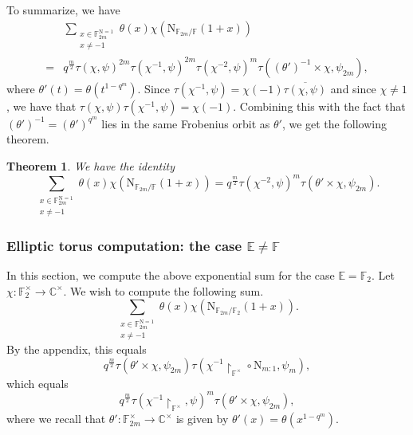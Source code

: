 \documentclass[12pt, reqno]{amsart}
\newtheorem{theorem}{Theorem}[section]
\theoremstyle{definition}
\theoremstyle{definition}
\theoremstyle{definition}
\newcommand{\cComplex}{\mathbb{C}}
\newcommand{\multiplicativegroup}[1]{#1^{\times}}
\newcommand{\conjugate}[1]{\overline{#1}}
\newcommand{\fieldCharacter}{\psi}
\newcommand{\FieldNorm}[2]{\mathrm{N}_{#1:#2}}
\newcommand{\aFieldNorm}{\mathrm{N}}
\newcommand{\finiteField}{\mathbb{F}}
\newcommand{\quadraticExtension}{\mathbb{E}}
\newcommand{\finiteFieldExtension}[1]{\finiteField_{#1}}
\newcommand{\NormOneGroup}[1]{\finiteFieldExtension{#1}^{\aFieldNorm = 1}}
\newcommand{\GaussSumSingleCharacter}[2]{\tau\left(#1, #2\right)}
\newcommand{\GaussSumCharacter}[3]{\tau\left(#1 \times #2, #3\right)}
\begin{document}
To summarize, we have
\begin{align*}
	& \sum_{\substack{x \in \NormOneGroup{2m}\\
			x \ne -1}} \theta \left(x\right) \chi\left(\aFieldNorm_{\finiteFieldExtension{2m} \slash \finiteField}\left(1 + x\right)\right) \\
		=& q^{\frac{m}{2}} \GaussSumSingleCharacter{\chi}{\fieldCharacter}^{2m} \GaussSumSingleCharacter{\chi^{-1}}{\fieldCharacter}^{2m} \GaussSumSingleCharacter{\chi^{-2}}{\fieldCharacter}^m \GaussSumCharacter{\left(\theta'\right)^{-1}}{\chi}{\fieldCharacter_{2m}},
\end{align*}
where $\theta'\left(t\right) = \theta\left(t^{1-q^m}\right)$.
Since $\tau\left(\chi^{-1}, \fieldCharacter\right) = \chi\left(-1\right) \conjugate{\tau\left(\chi, \fieldCharacter\right)}$ and since $\chi \ne 1$, we have that $\tau\left(\chi, \fieldCharacter\right) \tau\left(\chi^{-1}, \fieldCharacter\right) = \chi\left(-1\right)$. Combining this with the fact that $\left(\theta'\right)^{-1} = \left(\theta'\right)^{q^m}$ lies in the same Frobenius orbit as $\theta'$, we get the following theorem.
\begin{theorem}
	We have the identity $$\sum_{\substack{x \in \NormOneGroup{2m}\\
			x \ne -1}} \theta \left(x\right) \chi\left(\aFieldNorm_{\finiteFieldExtension{2m} \slash \finiteField}\left(1 + x\right)\right) = q^{\frac{m}{2}} \GaussSumSingleCharacter{\chi^{-2}}{\fieldCharacter}^m \GaussSumCharacter{\theta'}{\chi}{\fieldCharacter_{2m}}.$$
\end{theorem}

\subsubsection{Elliptic torus computation: the case $\quadraticExtension \ne \finiteField$}
In this section, we compute the above exponential sum for the case $\quadraticExtension = \finiteFieldExtension{2}$. Let $\chi \colon \multiplicativegroup{\finiteFieldExtension{2}} \to \multiplicativegroup{\cComplex}$. We wish to compute the following sum.
$$\sum_{\substack{x \in \NormOneGroup{2m}\\
		x \ne -1}} \theta \left(x\right) \chi\left(\aFieldNorm_{\finiteFieldExtension{2m} \slash \finiteFieldExtension{2}}\left(1 + x\right)\right).$$
By the appendix, this equals
$$q^{\frac{m}{2}} \GaussSumCharacter{\theta'}{\chi}{\fieldCharacter_{2m}} \tau\left(\chi^{-1} \restriction_{\multiplicativegroup{\finiteField}} \circ \FieldNorm{m}{1}, \fieldCharacter_m\right),$$
which equals
$$q^{\frac{m}{2}} \tau\left(\chi^{-1} \restriction_{\multiplicativegroup{\finiteField}}, \fieldCharacter\right)^m \GaussSumCharacter{\theta'}{\chi}{\fieldCharacter_{2m}},$$
where we recall that $\theta' \colon \multiplicativegroup{\finiteFieldExtension{2m}} \to \multiplicativegroup{\cComplex}$ is given by $\theta'\left(x\right) = \theta\left(x^{1-q^m}\right)$.
\end{document}

